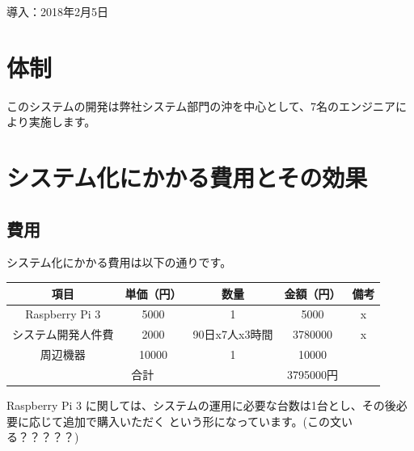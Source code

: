 \documentclass[a4j,titlepage]{ujarticle}
\begin{document}
導入：2018年2月5日

\section{体制}
このシステムの開発は弊社システム部門の沖を中心として、7名のエンジニアにより実施します。

\section{システム化にかかる費用とその効果}
\subsection{費用}
システム化にかかる費用は以下の通りです。

\begin{table}[htb]
  \begin{tabular}{|c|c|c|c|c|} \hline
    項目 & 単価（円） & 数量 & 金額（円） & 備考 \\ \hline
     Raspberry Pi 3 &  5000&  1&  5000& x \\ \hline
     システム開発人件費&  2000& 90日x7人x3時間&3780000&x  \\ \hline
     周辺機器&  10000&  1&  10000&  \\ \hline
    \multicolumn{3}{|c|}{合計}& 3795000円 &  \\ \hline
  \end{tabular}
\end{table}

Raspberry Pi 3 に関しては、システムの運用に必要な台数は1台とし、その後必要に応じて追加で購入いただく
という形になっています。(この文いる？？？？？)

\end{document}
